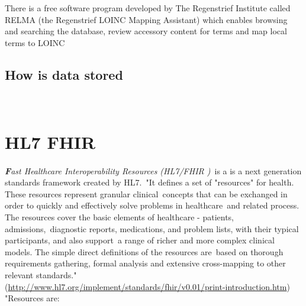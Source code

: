 \documentclass[DIV=calc, paper=a4, fontsize=12pt, onecolumn]{scrartcl}	 %
\newcommand{\initial}[1]{ %
\lettrine[lines=3,lhang=0.3,nindent=0em,slope=0em]{
\color{DarkBlue}
{\textbf{\textit{#1}}}}{}}
\begin{document}
There is a free software program developed by The Regenstrief Institute called RELMA (the Regenstrief LOINC Mapping Assistant) which enables browsing and searching the database, review accessory content for terms and map local terms to LOINC \citep{kroth_using_2012} 

\subsection{How is data stored}\


\section[Fast Healthcare Interoperability Resources (HL7 FHIR\textsuperscript{\texttrademark})]
{HL7 FHIR \textsuperscript{\texttrademark}}
  \label{sec:fhir}

\initial{F}\textit{ast Healthcare Interoperability Resources (HL7/FHIR )}\
is a is a next generation standards framework created by HL7.\
"It defines a set of "resources" for health. These resources represent granular clinical\
concepts that can be exchanged in order to quickly and effectively solve problems in healthcare\
 and related process. The resources cover the basic elements of healthcare - patients, admissions,\
diagnostic reports, medications, and problem lists, with their typical participants, and also support\
a range of richer and more complex clinical models. The simple direct definitions of the resources are\
 based on thorough requirements gathering, formal analysis and extensive cross-mapping to other relevant standards."\\
  (\url{http://www.hl7.org/implement/standards/fhir/v0.01/print-introduction.htm})\\

"Resources are:\
\end{document}
